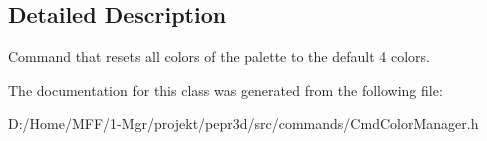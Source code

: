 \subsection{Detailed Description}
Command that resets all colors of the palette to the default 4 colors. 

The documentation for this class was generated from the following file\+:\begin{DoxyCompactItemize}
\item 
D\+:/\+Home/\+M\+F\+F/1-\/\+Mgr/projekt/pepr3d/src/commands/Cmd\+Color\+Manager.\+h\end{DoxyCompactItemize}
